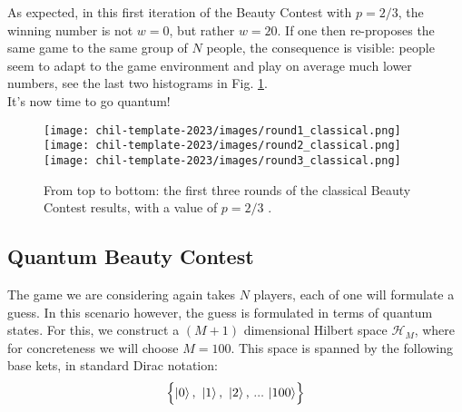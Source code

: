 As expected, in this first iteration of the Beauty Contest with $p=2/3$, the winning number is not $w=0$, but rather $w=20$. If one then re-proposes the same game to the same group of $N$ people, the consequence is visible: people seem to adapt to the game environment and play on average much lower numbers, see the last two histograms in Fig. \ref{fig:1}.\\

It's now time to go quantum!

\begin{figure}[h]
    \centering
    \texttt{[image: chil-template-2023/images/round1\_classical.png]}\vspace{0.5cm}
    \texttt{[image: chil-template-2023/images/round2\_classical.png]}\vspace{0.5cm}
    \texttt{[image: chil-template-2023/images/round3\_classical.png]}
    \caption{From top to bottom: the first three rounds of the classical Beauty Contest results, with a value of $p=2/3$ \citep{diekmann2009classical}.}
    \label{fig:1}
\end{figure}


\subsection{Quantum Beauty Contest}

The game we are considering again takes $N$ players, each of one will formulate a guess. In this scenario however, the guess is formulated in terms of quantum states. For this, we construct a $(M+1)$ dimensional Hilbert space $\mathcal{H}_M$, where for concreteness we will choose $M=100$. This space is spanned by the following base kets, in standard Dirac notation:
\begin{equation}
  \label{eq:basis}
  \Bigl\{\ket{0},\ \ket{1},\ \ket{2},\,...\,\ket{100}\Bigr\}
\end{equation}

